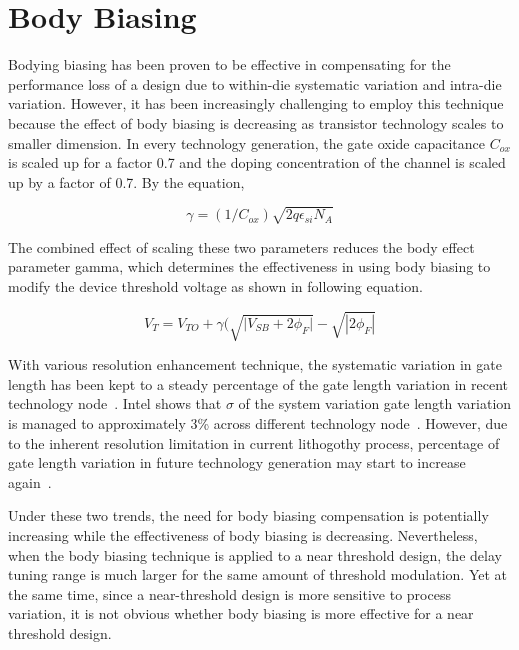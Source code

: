 \section{Body Biasing}
\label{sec:bodybiasing}

Bodying biasing has been proven to be effective in compensating for the
performance loss of a design due to within-die systematic variation and
intra-die variation. However, it has been increasingly challenging to employ
this technique because the effect of body biasing is decreasing as transistor
technology scales to smaller dimension. In every technology generation, the gate
oxide capacitance $C_{ox}$ is scaled up for a factor 0.7 and the doping
concentration of the channel is scaled up by a factor of 0.7. By the equation,

\begin{equation}
\gamma = (1/C_{ox})\sqrt{2q\epsilon_{si}N_A}
\end{equation}

The combined effect of scaling these two parameters reduces the body effect
parameter gamma, which determines the effectiveness in using body biasing to
modify the device threshold voltage as shown in following equation.

\begin{equation}
V_{T} = V_{TO} + \gamma ( \sqrt{ | {V_{SB} + 2\phi_{F} | } } - \sqrt{ | 2\phi_{F} | } 
\end{equation}

With various resolution enhancement technique, the systematic variation in gate length has been kept to a steady percentage of the gate length variation in recent technology node~\cite{Intel:2009}. Intel shows that $\sigma$ of the system variation gate length variation is managed to approximately 3\% across different technology node~\cite{Intel:2009}. However, due to the inherent resolution limitation in current lithogothy process, percentage of gate length variation in future technology generation may start to increase again~\cite{OPC20}.    


Under these two trends, the need for body biasing compensation is potentially increasing
while the effectiveness of body biasing is decreasing. Nevertheless, when the
body biasing technique is applied to a near threshold design, the delay tuning
range is much larger for the same amount of threshold modulation. Yet at the
same time, since a near-threshold design is more sensitive to process variation,
it is not obvious whether body biasing is more effective for a near threshold
design. 

